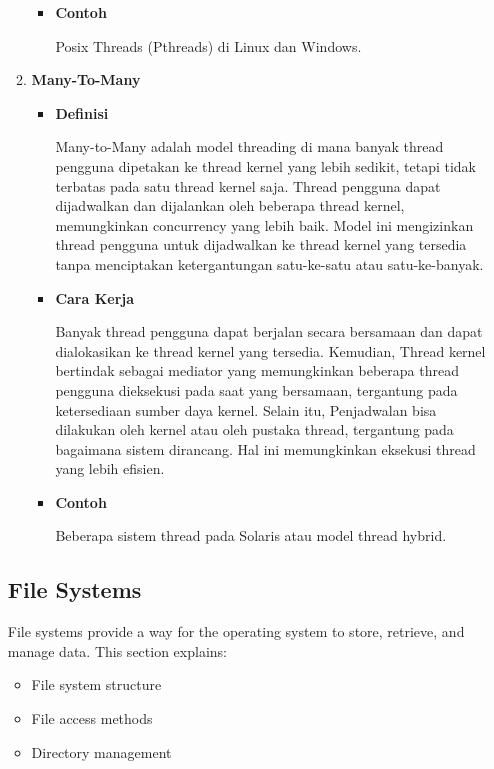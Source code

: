 \documentclass[12pt]{article}
\begin{document}
\begin{itemize}
\begin{enumerate}
\begin{itemize}
        \item\textbf{Contoh}
        \par \hspace{2em} Posix Threads (Pthreads) di Linux dan Windows.
    \end{itemize}
    \item\textbf{Many-To-Many}
        \begin{itemize}
        \item\textbf{Definisi} 
        \par \hspace{2em} Many-to-Many adalah model threading di mana banyak thread pengguna dipetakan ke thread kernel yang lebih sedikit, tetapi tidak terbatas pada satu thread kernel saja. Thread pengguna dapat dijadwalkan dan dijalankan oleh beberapa thread kernel, memungkinkan concurrency yang lebih baik. Model ini mengizinkan thread pengguna untuk dijadwalkan ke thread kernel yang tersedia tanpa menciptakan ketergantungan satu-ke-satu atau satu-ke-banyak.
        \item\textbf{Cara Kerja}
        \par \hspace{2em} Banyak thread pengguna dapat berjalan secara bersamaan dan dapat dialokasikan ke thread kernel yang tersedia. Kemudian, Thread kernel bertindak sebagai mediator yang memungkinkan beberapa thread pengguna dieksekusi pada saat yang bersamaan, tergantung pada ketersediaan sumber daya kernel. Selain itu, Penjadwalan bisa dilakukan oleh kernel atau oleh pustaka thread, tergantung pada bagaimana sistem dirancang. Hal ini memungkinkan eksekusi thread yang lebih efisien.
        \item\textbf{Contoh}
        \par \hspace{2em} Beberapa sistem thread pada Solaris atau model thread hybrid.
    \end{itemize}
\end{enumerate}

\subsection{File Systems}
File systems provide a way for the operating system to store, retrieve, and manage data. This section explains:
\begin{itemize}
    \item File system structure
    \item File access methods
    \item Directory management
\end{itemize}


\end{itemize}
\end{document}
